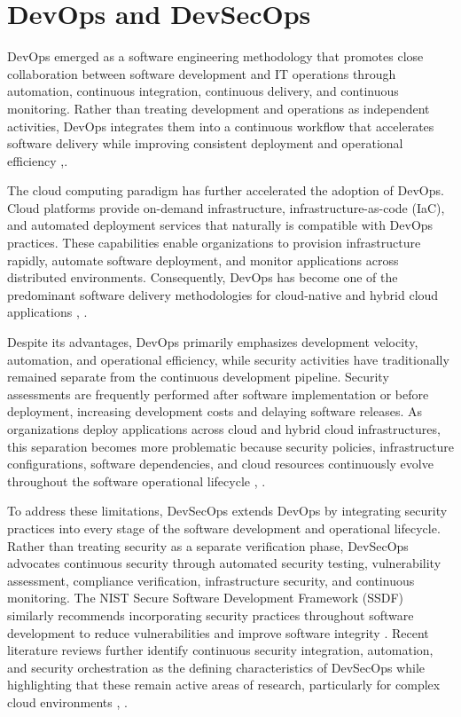 \section{DevOps and DevSecOps}
\label{sec:DevSecOps}

DevOps emerged as a software engineering methodology that promotes close collaboration between software development and IT operations through automation, continuous integration, continuous delivery, and continuous monitoring. Rather than treating development and operations as independent activities, DevOps integrates them into a continuous workflow that accelerates software delivery while improving consistent deployment and operational efficiency \cite{Bass2015DevOps},\cite{Humble2010ContinuousDelivery}.

The cloud computing paradigm has further accelerated the adoption of DevOps. Cloud platforms provide on-demand infrastructure, infrastructure-as-code (IaC), and automated deployment services that naturally is compatible with DevOps practices. These capabilities enable organizations to provision infrastructure rapidly, automate software deployment, and monitor applications across distributed environments. Consequently, DevOps has become one of the predominant software delivery methodologies for cloud-native and hybrid cloud applications \cite{Bass2015DevOps}, \cite{Liu2011NISTRA}.

Despite its advantages, DevOps primarily emphasizes development velocity, automation, and operational efficiency, while security activities have traditionally remained separate from the continuous development pipeline. Security assessments are frequently performed after software implementation or before deployment, increasing development costs and delaying software releases. As organizations deploy applications across cloud and hybrid cloud infrastructures, this separation becomes more problematic because security policies, infrastructure configurations, software dependencies, and cloud resources continuously evolve throughout the software operational lifecycle \cite{Rajapakse2021DevSecOpsSLR}, \cite{Myrbakken2017DevSecOps}.

To address these limitations, DevSecOps extends DevOps by integrating security practices into every stage of the software development and operational lifecycle. Rather than treating security as a separate verification phase, DevSecOps advocates continuous security through automated security testing, vulnerability assessment, compliance verification, infrastructure security, and continuous monitoring. The NIST Secure Software Development Framework (SSDF) similarly recommends incorporating security practices throughout software development to reduce vulnerabilities and improve software integrity \cite{NISTSSDF2022}. Recent literature reviews further identify continuous security integration, automation, and security orchestration as the defining characteristics of DevSecOps while highlighting that these remain active areas of research, particularly for complex cloud environments \cite{Rajapakse2021DevSecOpsSLR}, \cite{Zhao2024DevSecOpsMLR}.


